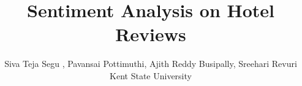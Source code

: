 \usepackage{filecontents}
\usepackage{cite}
\usepackage{amsmath,amssymb,amsfonts}
\usepackage{graphicx}
\usepackage{textcomp}
\usepackage{tabularx}
\usepackage{subcaption}
\usepackage{makecell}
\usepackage{url}
\usepackage[switch]{lineno}
\usepackage{listings}
\usepackage{multirow}

\captionsetup{compatibility=false}
\usepackage[margin=0.5in]{geometry}
\usepackage{textcomp}

\usepackage{listings}






\title{ Sentiment Analysis on Hotel Reviews}

\author{Siva Teja Segu , Pavansai Pottimuthi, Ajith Reddy Busipally, Sreehari Revuri\\

Kent State University}

